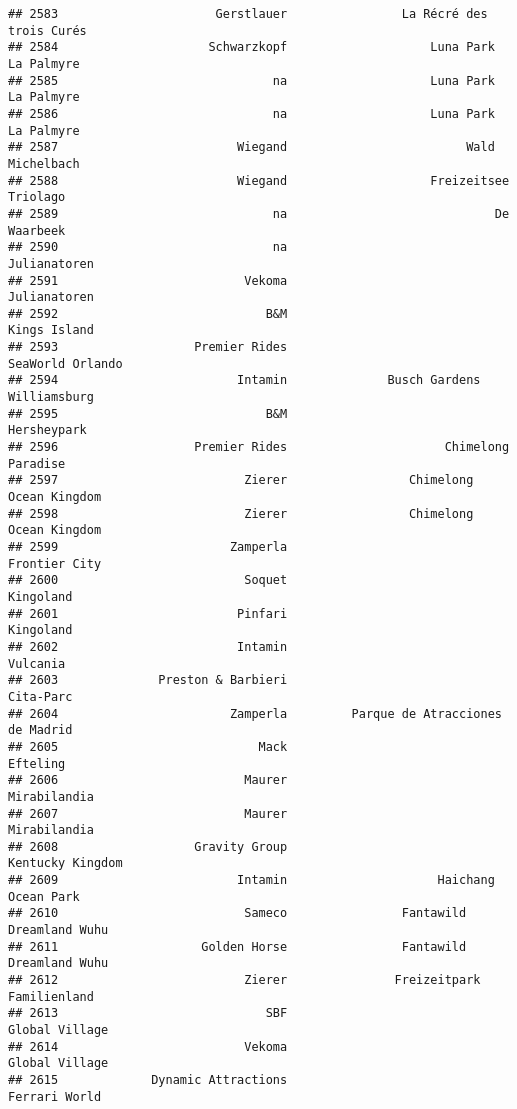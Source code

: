 \documentclass[
]{article}
\begin{document}
\begin{verbatim}
## 2583                      Gerstlauer                La Récré des trois Curés
## 2584                     Schwarzkopf                    Luna Park La Palmyre
## 2585                              na                    Luna Park La Palmyre
## 2586                              na                    Luna Park La Palmyre
## 2587                         Wiegand                         Wald Michelbach
## 2588                         Wiegand                    Freizeitsee Triolago
## 2589                              na                             De Waarbeek
## 2590                              na                            Julianatoren
## 2591                          Vekoma                            Julianatoren
## 2592                             B&M                            Kings Island
## 2593                   Premier Rides                        SeaWorld Orlando
## 2594                         Intamin              Busch Gardens Williamsburg
## 2595                             B&M                             Hersheypark
## 2596                   Premier Rides                      Chimelong Paradise
## 2597                          Zierer                 Chimelong Ocean Kingdom
## 2598                          Zierer                 Chimelong Ocean Kingdom
## 2599                        Zamperla                           Frontier City
## 2600                          Soquet                               Kingoland
## 2601                         Pinfari                               Kingoland
## 2602                         Intamin                                Vulcania
## 2603              Preston & Barbieri                               Cita-Parc
## 2604                        Zamperla         Parque de Atracciones de Madrid
## 2605                            Mack                                Efteling
## 2606                          Maurer                            Mirabilandia
## 2607                          Maurer                            Mirabilandia
## 2608                   Gravity Group                        Kentucky Kingdom
## 2609                         Intamin                     Haichang Ocean Park
## 2610                          Sameco                Fantawild Dreamland Wuhu
## 2611                    Golden Horse                Fantawild Dreamland Wuhu
## 2612                          Zierer               Freizeitpark Familienland
## 2613                             SBF                          Global Village
## 2614                          Vekoma                          Global Village
## 2615             Dynamic Attractions                           Ferrari World

\end{verbatim}
\end{document}
